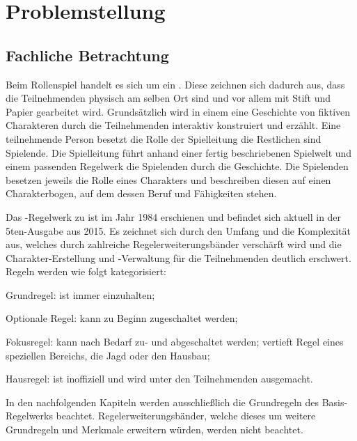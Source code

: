 \section{Problemstellung}
\label{sec:problemstellung}


\subsection{Fachliche Betrachtung}
\label{subsec:fachliche-betrachtung}

Beim Rollenspiel  handelt es sich um ein \sog {}.
Diese zeichnen sich \insb dadurch aus, dass die Teilnehmenden physisch am selben Ort sind und vor allem mit Stift und Papier gearbeitet wird.
Grundsätzlich wird in einem  eine Geschichte von fiktiven Charakteren durch die Teilnehmenden interaktiv konstruiert und erzählt.
Eine teilnehmende Person besetzt die Rolle der Spielleitung\; die Restlichen sind Spielende.
Die Spielleitung führt anhand einer fertig beschriebenen Spielwelt und einem passenden Regelwerk die Spielenden durch die Geschichte.
Die Spielenden besetzen jeweils die Rolle eines Charakters und beschreiben diesen auf einen \sog Charakterbogen, auf dem \uA dessen Beruf und Fähigkeiten stehen.

Das -Regelwerk zu  ist im Jahr 1984 erschienen und befindet sich aktuell in der 5ten-Ausgabe aus 2015.
Es zeichnet sich \insb durch den Umfang und die Komplexität aus, welches durch zahlreiche Regelerweiterungsbänder verschärft wird und \uA die Charakter-Erstellung und -Verwaltung für die Teilnehmenden deutlich erschwert.
Regeln werden wie folgt kategorisiert:
\begin{inparaenum}
    [a)]
    \item Grundregel: ist immer einzuhalten;
    \item Optionale Regel: kann zu Beginn zugeschaltet werden;
    \item Fokusregel: kann nach Bedarf zu- und abgeschaltet werden; vertieft Regel eines speziellen Bereichs, \zB die Jagd oder den Hausbau;
    \item Hausregel: ist inoffiziell und wird unter den Teilnehmenden ausgemacht.
\end{inparaenum}

In den nachfolgenden Kapiteln werden ausschließlich die Grundregeln des Basis-Regelwerks beachtet.
Regelerweiterungsbänder, welche dieses um weitere Grundregeln und Merkmale erweitern würden, werden nicht beachtet.


